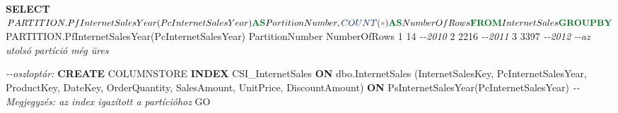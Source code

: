 \documentclass[
  magyar,
]{article}
\newenvironment{Shaded}{}{}
\newcommand{\CommentTok}[1]{\textcolor[rgb]{0.38,0.63,0.69}{\textit{#1}}}
\newcommand{\DecValTok}[1]{\textcolor[rgb]{0.25,0.63,0.44}{#1}}
\newcommand{\FunctionTok}[1]{\textcolor[rgb]{0.02,0.16,0.49}{#1}}
\newcommand{\KeywordTok}[1]{\textcolor[rgb]{0.00,0.44,0.13}{\textbf{#1}}}
\newcommand{\NormalTok}[1]{#1}
\newcommand{\OperatorTok}[1]{\textcolor[rgb]{0.40,0.40,0.40}{#1}}
\begin{document}
\begin{Shaded}
\begin{Highlighting}[]
\KeywordTok{SELECT}\NormalTok{ $PARTITION.PfInternetSalesYear(PcInternetSalesYear) }\KeywordTok{AS}\NormalTok{ PartitionNumber,}
\FunctionTok{COUNT}\NormalTok{(}\OperatorTok{*}\NormalTok{) }\KeywordTok{AS}\NormalTok{ NumberOfRows}
\KeywordTok{FROM}\NormalTok{ InternetSales }\KeywordTok{GROUP} \KeywordTok{BY}\NormalTok{ $PARTITION.PfInternetSalesYear(PcInternetSalesYear)}
\NormalTok{PartitionNumber     NumberOfRows}
\DecValTok{1}                   \DecValTok{14}          \CommentTok{{-}{-}2010}
\DecValTok{2}                   \DecValTok{2216}        \CommentTok{{-}{-}2011}
\DecValTok{3}                   \DecValTok{3397}        \CommentTok{{-}{-}2012}
\CommentTok{{-}{-}az utolsó partíció még üres}

\CommentTok{{-}{-}oszloptár:}
\KeywordTok{CREATE}\NormalTok{ COLUMNSTORE }\KeywordTok{INDEX}\NormalTok{ CSI\_InternetSales }\KeywordTok{ON}\NormalTok{ dbo.InternetSales}
\NormalTok{   (InternetSalesKey, PcInternetSalesYear, ProductKey, DateKey,}
\NormalTok{   OrderQuantity, SalesAmount, UnitPrice, DiscountAmount)}
\KeywordTok{ON}\NormalTok{ PsInternetSalesYear(PcInternetSalesYear) }\CommentTok{{-}{-}Megjegyzés: az index igazított a partícióhoz}
\NormalTok{GO}


\end{Highlighting}
\end{Shaded}
\end{document}
